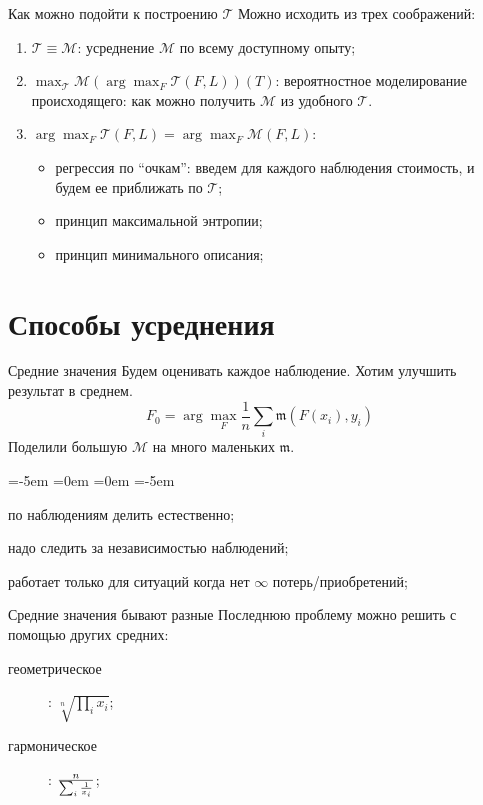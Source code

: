 \documentclass[14pt, fleqn, xcolor={dvipsnames, table}]{beamer}
\begin{document}
\begin{frame}{Как можно подойти к построению $\mathcal{T}$}
Можно исходить из трех соображений:
\begin{enumerate}
  \item {\color{blue}$\mathcal{T} \equiv \mathcal{M}$:} усреднение $\mathcal{M}$ по всему доступному опыту;
  \item {\color{blue}$\max_{\mathcal{T}} \mathcal{M} \left(\arg\max_{F} \mathcal{T}(F, L)\right)(T)$:} вероятностное моделирование происходящего: как можно получить $\mathcal{M}$ из удобного $\mathcal{T}$.
  \item {\color{blue}$\arg\max_{F} \mathcal{T}(F, L) = \arg\max_{F} \mathcal{M}(F, L)$:}~\\
  \begin{itemize}
    \item регрессия по ``очкам'': введем для каждого наблюдения стоимость, и будем ее приближать по $\mathcal{T}$;
    \item принцип максимальной энтропии;
    \item принцип минимального описания;
  \end{itemize}

\end{enumerate} 
\end{frame}

\section{Способы усреднения}

\begin{frame}{Средние значения}
Будем оценивать каждое наблюдение. Хотим улучшить результат в среднем.
$$
F_0 = \arg \max_F \frac{1}{n} \sum_i \mathfrak{m}(F(x_i),y_i)
$$
Поделили большую $\mathcal{M}$ на много маленьких $\mathfrak{m}$. 
\begin{description}
\small
\leftmargin=-5em
\itemindent=0em
=0em
\leftskip=-5em
  \item[\color{green}+] по наблюдениям делить естественно;
  \item[\color{red}---] надо следить за независимостью наблюдений;
  \item[\color{red}---] работает только для ситуаций когда нет $\infty$ потерь/приобретений;
\end{description} 
\end{frame}

\begin{frame}{Средние значения бывают разные}
Последнюю проблему можно решить с помощью других средних:

\begin{description}
  \item[геометрическое]: $\sqrt[n]{\prod_i x_i}$; 
  \item[гармоническое]: $n\over \sum_i \frac{1}{x_i}$;
\end{description}
\end{frame}
\end{document}
